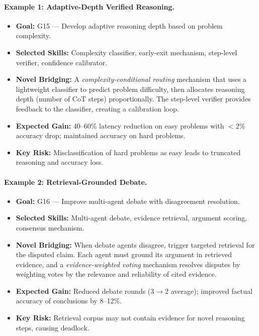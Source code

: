 \paragraph{Example 1: Adaptive-Depth Verified Reasoning.}
\begin{itemize}[leftmargin=*]
\item \textbf{Goal:} G15 --- Develop adaptive reasoning depth based on problem complexity.
\item \textbf{Selected Skills:} Complexity classifier, early-exit mechanism, step-level verifier, confidence calibrator.
\item \textbf{Novel Bridging:} A \emph{complexity-conditional routing} mechanism that uses a lightweight classifier to predict problem difficulty, then allocates reasoning depth (number of CoT steps) proportionally. The step-level verifier provides feedback to the classifier, creating a calibration loop.
\item \textbf{Expected Gain:} 40--60\% latency reduction on easy problems with $<$2\% accuracy drop; maintained accuracy on hard problems.
\item \textbf{Key Risk:} Misclassification of hard problems as easy leads to truncated reasoning and accuracy loss.
\end{itemize}

\paragraph{Example 2: Retrieval-Grounded Debate.}
\begin{itemize}[leftmargin=*]
\item \textbf{Goal:} G16 --- Improve multi-agent debate with disagreement resolution.
\item \textbf{Selected Skills:} Multi-agent debate, evidence retrieval, argument scoring, consensus mechanism.
\item \textbf{Novel Bridging:} When debate agents disagree, trigger targeted retrieval for the disputed claim. Each agent must ground its argument in retrieved evidence, and a \emph{evidence-weighted voting} mechanism resolves disputes by weighting votes by the relevance and reliability of cited evidence.
\item \textbf{Expected Gain:} Reduced debate rounds (3$\to$2 average); improved factual accuracy of conclusions by 8--12\%.
\item \textbf{Key Risk:} Retrieval corpus may not contain evidence for novel reasoning steps, causing deadlock.
\end{itemize}
